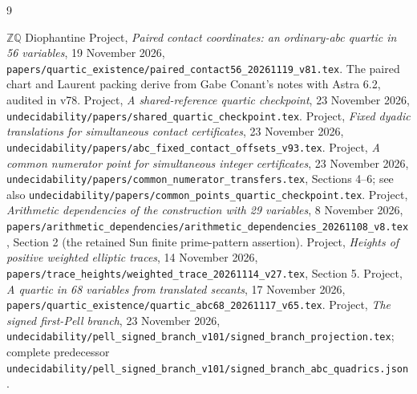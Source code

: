 \documentclass[11pt]{article}
\newcommand{\Q}{\mathbb Q}\newcommand{\Z}{\mathbb Z}
\begin{document}
\small
\begin{thebibliography}{9}\raggedright
\setlength{\itemsep}{2pt}
 \(\Z\Q\) Diophantine Project,
\emph{Paired contact coordinates: an ordinary-abc quartic in 56 variables},
19 November 2026,
\nolinkurl{papers/quartic_existence/paired_contact56_20261119_v81.tex}.
The paired chart and Laurent packing derive from Gabe Conant's notes
with Astra 6.2, audited in v78.
 Project, \emph{A shared-reference quartic checkpoint},
23 November 2026,
\nolinkurl{undecidability/papers/shared_quartic_checkpoint.tex}.
 Project, \emph{Fixed dyadic translations for simultaneous
contact certificates}, 23 November 2026,
\nolinkurl{undecidability/papers/abc_fixed_contact_offsets_v93.tex}.
 Project, \emph{A common numerator point for simultaneous
integer certificates}, 23 November 2026,
\nolinkurl{undecidability/papers/common_numerator_transfers.tex},
Sections 4--6; see also
\nolinkurl{undecidability/papers/common_points_quartic_checkpoint.tex}.
 Project, \emph{Arithmetic dependencies of the construction
with 29 variables}, 8 November 2026,
\nolinkurl{papers/arithmetic_dependencies/arithmetic_dependencies_20261108_v8.tex},
Section 2 (the retained Sun finite prime-pattern assertion).
 Project, \emph{Heights of positive weighted elliptic traces},
14 November 2026,
\nolinkurl{papers/trace_heights/weighted_trace_20261114_v27.tex}, Section 5.
 Project, \emph{A quartic in 68 variables from translated
secants}, 17 November 2026,
\nolinkurl{papers/quartic_existence/quartic_abc68_20261117_v65.tex}.
 Project, \emph{The signed first-Pell branch},
23 November 2026,
\nolinkurl{undecidability/pell_signed_branch_v101/signed_branch_projection.tex};
complete predecessor
\nolinkurl{undecidability/pell_signed_branch_v101/signed_branch_abc_quadrics.json}.
\end{thebibliography}
\end{document}

